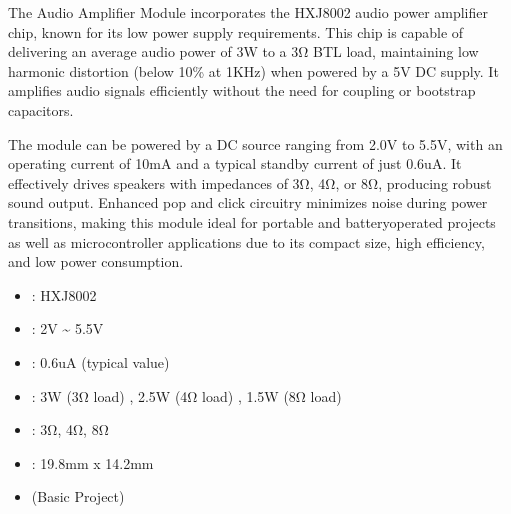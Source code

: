 \documentclass[a4paper,11pt,english]{sphinxmanual}
\let\sphinxpxdimen\pdfpxdimen\else\newdimen\sphinxpxdimen
\begin{document}
\noindent{}

\sphinxAtStartPar
{}

\noindent{\hspace*{\fill}\sphinxincludegraphics[width=500\sphinxpxdimen]{{audio_module}.jpg}\hspace*{\fill}}

\sphinxAtStartPar
The Audio Amplifier Module incorporates the HXJ8002 audio power amplifier chip, known for its low power supply requirements. This chip is capable of delivering an average audio power of 3W to a 3Ω BTL load, maintaining low harmonic distortion (below 10\% at 1KHz) when powered by a 5V DC supply. It amplifies audio signals efficiently without the need for coupling or bootstrap capacitors.

\sphinxAtStartPar
The module can be powered by a DC source ranging from 2.0V to 5.5V, with an operating current of 10mA and a typical standby current of just 0.6uA. It effectively drives speakers with impedances of 3Ω, 4Ω, or 8Ω, producing robust sound output. Enhanced pop and click circuitry minimizes noise during power transitions, making this module ideal for portable and battery\sphinxhyphen{}operated projects as well as microcontroller applications due to its compact size, high efficiency, and low power consumption.
\begin{itemize}
\item {} 
\sphinxAtStartPar
{}: HXJ8002

\item {} 
\sphinxAtStartPar
{}: 2V \textasciitilde{} 5.5V

\item {} 
\sphinxAtStartPar
{}: 0.6uA (typical value)

\item {} 
\sphinxAtStartPar
{}: 3W (3Ω load) , 2.5W (4Ω load) , 1.5W (8Ω load)

\item {} 
\sphinxAtStartPar
{}: 3Ω, 4Ω, 8Ω

\item {} 
\sphinxAtStartPar
{}: 19.8mm x 14.2mm

\end{itemize}

\sphinxAtStartPar
{}
\begin{itemize}
\item {} 
\sphinxAtStartPar
{\hyperref[\detokenize{Basic_Project/Audio_Module_Speaker:basic-audio-module-speaker}]{}} (Basic Project)

\end{itemize}
\end{document}
